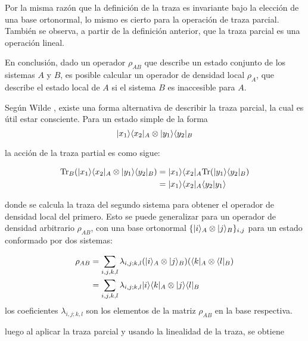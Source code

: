 Por la misma razón que la definición de la traza es invariante bajo la elección de una base ortonormal, lo mismo es cierto para la operación de traza parcial. También se observa, a partir de la definición anterior, que la traza parcial es una operación lineal.


En conclusión, dado un operador $\rho_{AB}$ que describe un estado conjunto de los sistemas $A$ y $B$, es posible calcular un operador de densidad local $\rho_A$, que describe el estado local de $A$ si el sistema $B$ es inaccesible para $A$.


Según Wilde {\cite{wilde2011classical}}, existe una forma alternativa de describir la traza parcial, la cual es útil estar consciente. Para un estado simple de la forma 
\begin{equation}
	|x_1\rangle \langle x_2|_A\otimes|y_1\rangle \langle y_2|_B
\end{equation}

la acción de la traza partial es como sigue:

\begin{equation}
	\begin{split}
	{\rm Tr}_B(	|x_1\rangle \langle x_2|_A\otimes|y_1\rangle \langle y_2|_B)&=|x_1\rangle \langle x_2|_A{\rm Tr}(|y_1\rangle \langle y_2|_B)\\
	&=|x_1\rangle \langle x_2|_A \langle y_2|y_1\rangle
	\end{split}
\end{equation}

donde se calcula la traza del segundo sistema para obtener el operador de densidad local del primero. Esto se puede generalizar para un operador de densidad arbitrario $\rho_{AB}$, con una base ortonormal $\{|i \rangle_A \otimes |j\rangle_B \} _{i,j}$ para un estado conformado por dos sistemas:


\begin{equation}
	\begin{split}
	\rho_{AB}&=\sum_{i,j,k,l}\lambda_{i,j;k,l}(|i\rangle_A \otimes|j\rangle_B)(\langle k|_A\otimes \langle l|_B)\\
	&=\sum_{i,j,k,l}\lambda_{i,j;k,l} |i\rangle \langle k|_A\otimes|j\rangle \langle l|_B
	\end{split}
\end{equation}
los coeficientes $\lambda_{i,j;k,l}$  son los elementos de la matriz $\rho_{AB}$ en la base respectiva.


luego al aplicar la traza parcial y usando la linealidad de la traza, se obtiene



